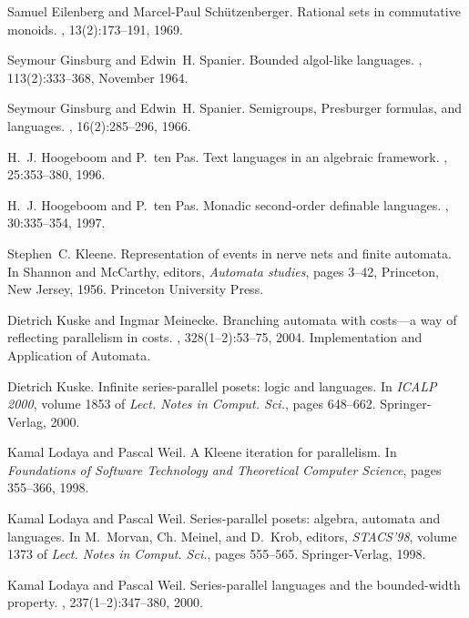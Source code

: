 \documentclass{CSML}
\begin{document}
\begin{thebibliography}{LW98b}
Samuel Eilenberg and Marcel-Paul Sch\"utzenberger.
\newblock Rational sets in commutative monoids.
, 13(2):173--191, 1969.

Seymour Ginsburg and Edwin~H. Spanier.
\newblock Bounded algol-like languages.
,
  113(2):333--368, November 1964.

Seymour Ginsburg and Edwin~H. Spanier.
\newblock Semigroups, {P}resburger formulas, and languages.
, 16(2):285--296, 1966.

H.~J. Hoogeboom and P.~ten Pas.
\newblock Text languages in an algebraic framework.
, 25:353--380, 1996.

H.~J. Hoogeboom and P.~ten Pas.
\newblock Monadic second-order definable languages.
, 30:335--354, 1997.

Stephen~C. Kleene.
\newblock Representation of events in nerve nets and finite automata.
\newblock In Shannon and McCarthy, editors, {\em Automata studies}, pages
  3--42, Princeton, New Jersey, 1956. Princeton University Press.

Dietrich Kuske and Ingmar Meinecke.
\newblock Branching automata with costs—a way of reflecting parallelism in
  costs.
, 328(1--2):53--75, 2004.
\newblock Implementation and Application of Automata.

Dietrich Kuske.
\newblock Infinite series-parallel posets: logic and languages.
\newblock In {\em ICALP 2000}, volume 1853 of {\em Lect. Notes in Comput.
  Sci.}, pages 648--662. Springer-Verlag, 2000.

Kamal Lodaya and Pascal Weil.
\newblock A {K}leene iteration for parallelism.
\newblock In {\em Foundations of Software Technology and Theoretical Computer
  Science}, pages 355--366, 1998.

Kamal Lodaya and Pascal Weil.
\newblock Series-parallel posets: algebra, automata and languages.
\newblock In M.~Morvan, Ch. Meinel, and D.~Krob, editors, {\em STACS'98},
  volume 1373 of {\em Lect. Notes in Comput. Sci.}, pages 555--565.
  Springer-Verlag, 1998.

Kamal Lodaya and Pascal Weil.
\newblock Series-parallel languages and the bounded-width property.
, 237(1--2):347--380, 2000.


\end{thebibliography}
\end{document}
